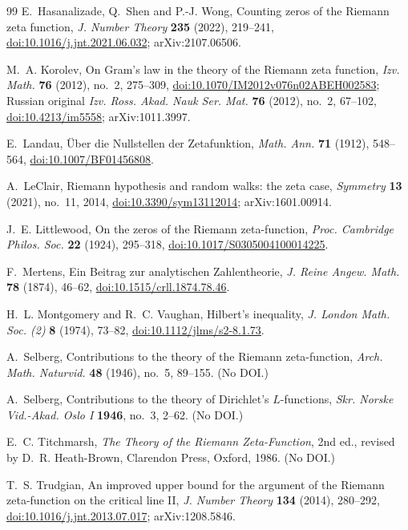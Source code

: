 \documentclass[11pt,reqno]{amsart}
\theoremstyle{plain}\newtheorem{theorem}{Theorem}[section]\newtheorem{proposition}[theorem]{Proposition}\newtheorem{lemma}[theorem]{Lemma}\newtheorem{corollary}[theorem]{Corollary}
\theoremstyle{definition}\newtheorem{hypothesis}[theorem]{Hypothesis}\newtheorem{definition}[theorem]{Definition}
\theoremstyle{remark}\newtheorem{remark}[theorem]{Remark}\newtheorem{experiment}[theorem]{Experiment}\newtheorem{question}[theorem]{Question}\newtheorem{heuristic}[theorem]{Heuristic}\newtheorem{conjecture}[theorem]{Conjecture}
\begin{document}
\begin{thebibliography}{99}
E.~Hasanalizade, Q.~Shen and P.-J. Wong, Counting zeros of the Riemann zeta function, \emph{J. Number Theory} \textbf{235} (2022), 219--241, \href{https://doi.org/10.1016/j.jnt.2021.06.032}{doi:10.1016/j.jnt.2021.06.032}; arXiv:2107.06506.

M.~A. Korolev, On Gram's law in the theory of the Riemann zeta function, \emph{Izv. Math.} \textbf{76} (2012), no.~2, 275--309, \href{https://doi.org/10.1070/IM2012v076n02ABEH002583}{doi:10.1070/IM2012v076n02ABEH002583}; Russian original \emph{Izv. Ross. Akad. Nauk Ser. Mat.} \textbf{76} (2012), no.~2, 67--102, \href{https://doi.org/10.4213/im5558}{doi:10.4213/im5558}; arXiv:1011.3997.

E.~Landau, \"Uber die Nullstellen der Zetafunktion, \emph{Math. Ann.} \textbf{71} (1912), 548--564, \href{https://doi.org/10.1007/BF01456808}{doi:10.1007/BF01456808}.

A.~LeClair, Riemann hypothesis and random walks: the zeta case, \emph{Symmetry} \textbf{13} (2021), no.~11, 2014, \href{https://doi.org/10.3390/sym13112014}{doi:10.3390/sym13112014}; arXiv:1601.00914.

J.~E. Littlewood, On the zeros of the Riemann zeta-function, \emph{Proc. Cambridge Philos. Soc.} \textbf{22} (1924), 295--318, \href{https://doi.org/10.1017/S0305004100014225}{doi:10.1017/S0305004100014225}.

F.~Mertens, Ein Beitrag zur analytischen Zahlentheorie, \emph{J. Reine Angew. Math.} \textbf{78} (1874), 46--62, \href{https://doi.org/10.1515/crll.1874.78.46}{doi:10.1515/crll.1874.78.46}.

H.~L. Montgomery and R.~C. Vaughan, Hilbert's inequality, \emph{J. London Math. Soc. (2)} \textbf{8} (1974), 73--82, \href{https://doi.org/10.1112/jlms/s2-8.1.73}{doi:10.1112/jlms/s2-8.1.73}.

A.~Selberg, Contributions to the theory of the Riemann zeta-function, \emph{Arch. Math. Naturvid.} \textbf{48} (1946), no.~5, 89--155. (No DOI.)

A.~Selberg, Contributions to the theory of Dirichlet's $L$-functions, \emph{Skr. Norske Vid.-Akad. Oslo I} \textbf{1946}, no.~3, 2--62. (No DOI.)

E.~C. Titchmarsh, \emph{The Theory of the Riemann Zeta-Function}, 2nd ed., revised by D.~R. Heath-Brown, Clarendon Press, Oxford, 1986. (No DOI.)

T.~S. Trudgian, An improved upper bound for the argument of the Riemann zeta-function on the critical line II, \emph{J. Number Theory} \textbf{134} (2014), 280--292, \href{https://doi.org/10.1016/j.jnt.2013.07.017}{doi:10.1016/j.jnt.2013.07.017}; arXiv:1208.5846.

\end{thebibliography}
\end{document}
